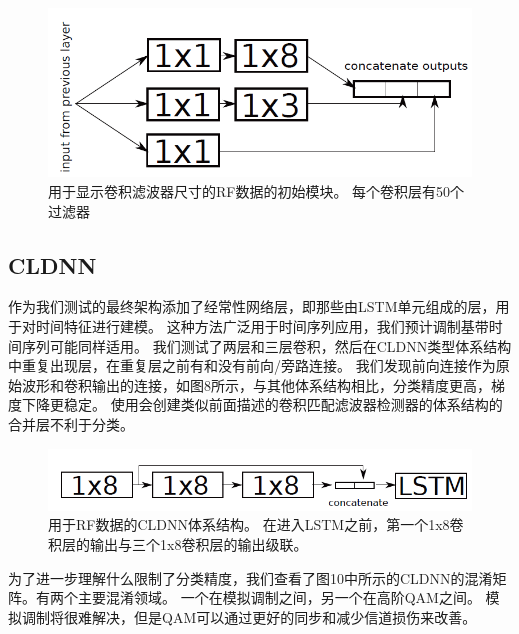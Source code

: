\begin{figure}[!h]
	\centering
	\includegraphics[scale=1]{figures/chapter_5/fig5}
	\caption{用于显示卷积滤波器尺寸的RF数据的初始模块。 每个卷积层有50个过滤器}
\end{figure}

\subsection{CLDNN}

作为我们测试的最终架构添加了经常性网络层，即那些由LSTM单元组成的层，用于对时间特征进行建模。 这种方法广泛用于时间序列应用，我们预计调制基带时间序列可能同样适用。 我们测试了两层和三层卷积，然后在CLDNN类型体系结构中重复出现层，在重复层之前有和没有前向/旁路连接。 我们发现前向连接作为原始波形和卷积输出的连接，如图8所示，与其他体系结构相比，分类精度更高，梯度下降更稳定。 使用会创建类似前面描述的卷积匹配滤波器检测器的体系结构的合并层不利于分类。\par
\begin{figure}[!h]
	\centering
	\includegraphics[scale=1]{figures/chapter_5/fig6}
	\caption{用于RF数据的CLDNN体系结构。 在进入LSTM之前，第一个1x8卷积层的输出与三个1x8卷积层的输出级联。}
\end{figure}

为了进一步理解什么限制了分类精度，我们查看了图10中所示的CLDNN的混淆矩阵。有两个主要混淆领域。 一个在模拟调制之间，另一个在高阶QAM之间。 模拟调制将很难解决，但是QAM可以通过更好的同步和减少信道损伤来改善。\par

